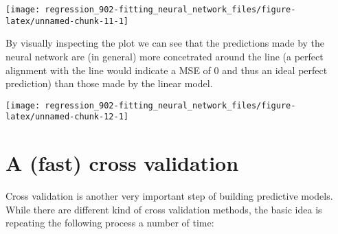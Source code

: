 \documentclass[]{book}
\newenvironment{Shaded}{\begin{snugshade}}{\end{snugshade}}
\newcommand{\DataTypeTok}[1]{\textcolor[rgb]{0.13,0.29,0.53}{#1}}
\newcommand{\DecValTok}[1]{\textcolor[rgb]{0.00,0.00,0.81}{#1}}
\newcommand{\FloatTok}[1]{\textcolor[rgb]{0.00,0.00,0.81}{#1}}
\newcommand{\KeywordTok}[1]{\textcolor[rgb]{0.13,0.29,0.53}{\textbf{#1}}}
\newcommand{\NormalTok}[1]{#1}
\newcommand{\OperatorTok}[1]{\textcolor[rgb]{0.81,0.36,0.00}{\textbf{#1}}}
\newcommand{\StringTok}[1]{\textcolor[rgb]{0.31,0.60,0.02}{#1}}
\begin{document}
\begin{center}\texttt{[image: regression\_902-fitting\_neural\_network\_files/figure-latex/unnamed-chunk-11-1]} \end{center}

By visually inspecting the plot we can see that the predictions made by the neural network are (in general) more concetrated around the line (a perfect alignment with the line would indicate a MSE of 0 and thus an ideal perfect prediction) than those made by the linear model.

\begin{Shaded}
\end{Shaded}

\begin{center}\texttt{[image: regression\_902-fitting\_neural\_network\_files/figure-latex/unnamed-chunk-12-1]} \end{center}

\hypertarget{a-fast-cross-validation}{%
\section{A (fast) cross validation}\label{a-fast-cross-validation}}

Cross validation is another very important step of building predictive models. While there are different kind of cross validation methods, the basic idea is repeating the following process a number of time:
\end{document}

